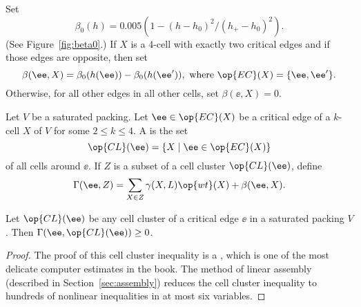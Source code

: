 \begin{definition}\label{def:beta} 
Set 
\[  
\beta_0(h) = 0.005 (1 - (h-h_0)^2/(h_+-h_0)^2).
\] 
(See Figure~\ref{fig:beta0}.)
If $X$ is a $4$-cell with exactly two critical edges and if those edges
are opposite, then set
\[  
\beta(\ee,X) = \beta_0(h(\ee)) - \beta_0(h(\ee')), 
\text{ where }\op{EC}(X) = \{\ee,\ee'\} .  
\] 
Otherwise, for all other edges in all other cells, set $\beta(\ee,X) = 0$.
\end{definition}
%
%

\pqfexqn

\begin{definition}\label{def:gammaL} 
  Let $V$ be a saturated packing.  Let $\ee\in \op{EC}(X)$ be a
  critical edge of a $k$-cell $X$ of $V$ for some $2\le k\le 4$.  A
   is the set
\[  
\op{CL}(\ee) = \{X\mid \ee\in \op{EC}(X)\} 
\] 
%
of all cells around $\ee$. 
If $Z$ is a subset of a cell cluster $\op{CL}(\ee)$, define
%
\[  
\Gamma(\ee,Z) = \sum_{X\in Z} \gamma(X,L) \op{wt}(X) +\beta(\ee,X).
\] 
%


\end{definition}
%

\begin{theorem} 
\label{lemma:cluster}
Let $\op{CL}(\ee)$ be any cell cluster of a critical edge $\ee$ in a saturated packing $V$.  
Then $\Gamma(\ee,\op{CL}(\ee))\ge 0$.
\end{theorem}

\begin{proof}
  The proof of this cell cluster inequality is a , which
  is one of the most delicate computer estimates in the book.   The
  method of linear assembly (described in Section~\ref{sec:assembly})
  reduces the cell cluster inequality to hundreds of nonlinear
  inequalities in at most six variables.
\end{proof}

